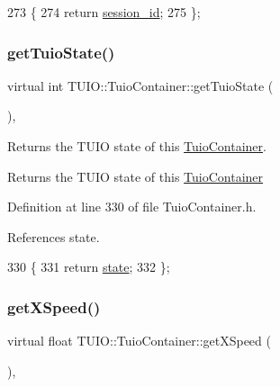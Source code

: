 \begin{DoxyCode}
273                                     \{ 
274             \textcolor{keywordflow}{return} \hyperlink{class_t_u_i_o_1_1_tuio_container_ab8249dadd0e87ff0b93078b731bec603}{session\_id};
275         \};
\end{DoxyCode}
\mbox{\label{class_t_u_i_o_1_1_tuio_container_aae941faa981d856324f596aab0e73cd1}} 
\subsubsection{\texorpdfstring{get\+Tuio\+State()}{getTuioState()}}
{\footnotesize\ttfamily virtual int T\+U\+I\+O\+::\+Tuio\+Container\+::get\+Tuio\+State (\begin{DoxyParamCaption}{ }\end{DoxyParamCaption})\hspace{0.3cm}{\ttfamily [inline]}, {\ttfamily [virtual]}}

Returns the T\+U\+IO state of this \hyperlink{class_t_u_i_o_1_1_tuio_container}{Tuio\+Container}. \begin{DoxyReturn}{Returns}
the T\+U\+IO state of this \hyperlink{class_t_u_i_o_1_1_tuio_container}{Tuio\+Container} 
\end{DoxyReturn}


Definition at line 330 of file Tuio\+Container.\+h.



References state.


\begin{DoxyCode}
330                                    \{ 
331             \textcolor{keywordflow}{return} \hyperlink{class_t_u_i_o_1_1_tuio_container_a61cfc66997d3d2f2a503e20bd29ddbf1}{state};
332         \};  
\end{DoxyCode}
\mbox{\label{class_t_u_i_o_1_1_tuio_container_acbb84622fb4d29c81adefac64e119bec}} 
\subsubsection{\texorpdfstring{get\+X\+Speed()}{getXSpeed()}}
{\footnotesize\ttfamily virtual float T\+U\+I\+O\+::\+Tuio\+Container\+::get\+X\+Speed (\begin{DoxyParamCaption}{ }\end{DoxyParamCaption})\hspace{0.3cm}{\ttfamily [inline]}, {\ttfamily [virtual]}}

